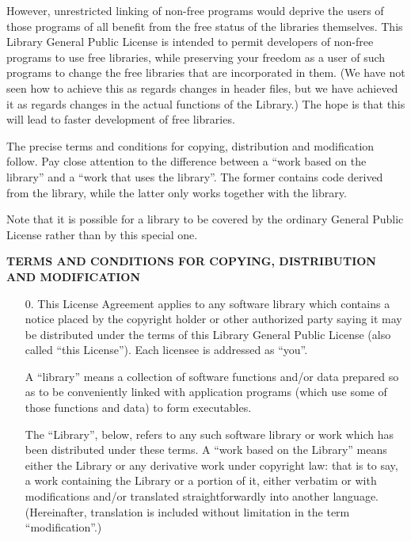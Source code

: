 \begin{multicols}{3}
However, unrestricted linking of non-free programs would deprive the users
of those programs of all benefit from the free status of the libraries
themselves. This Library General Public License is intended to permit
developers of non-free programs to use free libraries, while preserving
your freedom as a user of such programs to change the free libraries that
are incorporated in them. (We have not seen how to achieve this as regards
changes in header files, but we have achieved it as regards changes in the
actual functions of the Library.) The hope is that this will lead to faster
development of free libraries.

The precise terms and conditions for copying, distribution and modification
follow. Pay close attention to the difference between a ``work based on the
library'' and a ``work that uses the library''. The former contains code
derived from the library, while the latter only works together with the
library.

Note that it is possible for a library to be covered by the ordinary
General Public License rather than by this special one.

\begin{center}
\bf TERMS AND CONDITIONS FOR COPYING, DISTRIBUTION AND MODIFICATION
\end{center}

\begin{itemize}
\item[0.] This License Agreement applies to any software library which
  contains a notice placed by the copyright holder or other authorized
  party saying it may be distributed under the terms of this Library
  General Public License (also called ``this License''). Each licensee
  is addressed as ``you''.

   A ``library'' means a collection of software functions and/or data
   prepared so as to be conveniently linked with application programs
   (which use some of those functions and data) to form executables.

   The ``Library'', below, refers to any such software library or work which
   has been distributed under these terms. A ``work based on the Library''
   means either the Library or any derivative work under copyright law:
   that is to say, a work containing the Library or a portion of it, either
   verbatim or with modifications and/or translated straightforwardly into
   another language. (Hereinafter, translation is included without
   limitation in the term ``modification''.)


\end{itemize}
\end{multicols}
